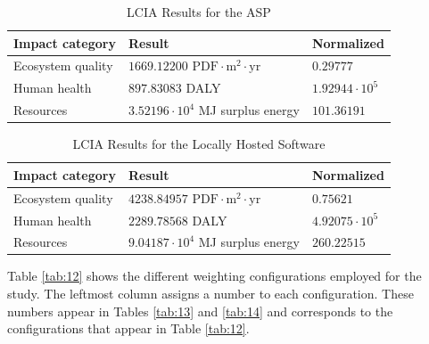 \documentclass[final,journal,10pt,letterpaper,oneside,twocolumn,compsoc]%
{IEEEtran}
\begin{document}
\begin{table}[t!]
  \caption{LCIA Results for the ASP}
  \label{tab:10}
  \centering
    \begin{tabular}{| l | l | l |}
      \hline
      Impact category   & Result             & Normalized \\
      \hline
      Ecosystem quality & $1669.12200 \textrm{ PDF} \cdot \textrm{m}^2 \cdot
                          \textrm{yr}$ & $0.29777$ \\
      Human health      & $897.83083$ DALY   & $1.92944 \cdot 10^5$ \\
      Resources & $3.52196 \cdot 10^4$ MJ surplus energy & $101.36191$ \\
      \hline
    \end{tabular}
\end{table}
\begin{table}[t!]
  \caption{LCIA Results for the Locally Hosted Software}
  \label{tab:11}
  \centering
    \begin{tabular}{| l | l | l |}
      \hline
      Impact category   & Result             & Normalized \\
      \hline
      Ecosystem quality & $4238.84957 \textrm{ PDF} \cdot \textrm{m}^2
                          \cdot \textrm{yr}$ & $0.75621$ \\
      Human health      & $2289.78568$ DALY   & $4.92075 \cdot 10^5$ \\
      Resources & $9.04187 \cdot 10^4$ MJ surplus energy & $260.22515$ \\
      \hline
    \end{tabular}
\end{table}

Table \ref{tab:12} shows the different weighting configurations employed for the
study.
The leftmost column assigns a number to each configuration. These
numbers appear in Tables \ref{tab:13} and \ref{tab:14} and corresponds to the
configurations that appear in Table \ref{tab:12}.
\end{document}
